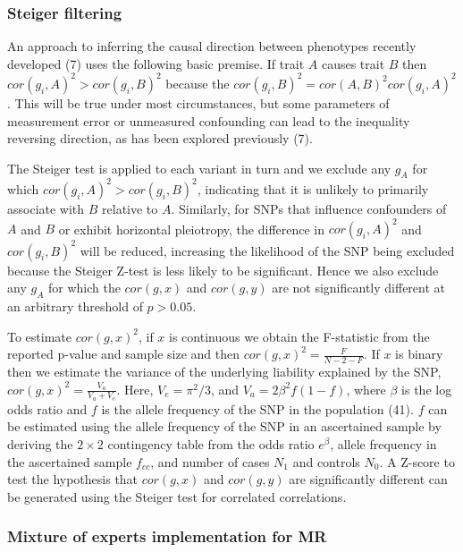 \documentclass[]{article}
\begin{document}
\subsubsection{Steiger filtering}\label{steiger-filtering-1}

An approach to inferring the causal direction between phenotypes
recently developed (7) uses the following basic premise. If trait \(A\)
causes trait \(B\) then \(cor(g_{i}, A)^2 > cor(g_{i}, B)^2\) because
the \(cor(g_{i}, B)^2 = cor(A, B)^{2} cor(g_{i}, A)^{2}\). This will be
true under most circumstances, but some parameters of measurement error
or unmeasured confounding can lead to the inequality reversing
direction, as has been explored previously (7).

The Steiger test is applied to each variant in turn and we exclude any
\(g_{A}\) for which \(cor(g_{i}, A)^2 > cor(g_{i}, B)^2\), indicating
that it is unlikely to primarily associate with \(B\) relative to \(A\).
Similarly, for SNPs that influence confounders of \(A\) and \(B\) or
exhibit horizontal pleiotropy, the difference in \(cor(g_{i}, A)^2\) and
\(cor(g_{i}, B)^2\) will be reduced, increasing the likelihood of the
SNP being excluded because the Steiger Z-test is less likely to be
significant. Hence we also exclude any \(g_{A}\) for which the
\(cor(g, x)\) and \(cor(g, y)\) are not significantly different at an
arbitrary threshold of \(p > 0.05\).

To estimate \(cor(g, x)^2\), if \(x\) is continuous we obtain the
F-statistic from the reported p-value and sample size and then
\(cor(g, x)^2 = \frac{F}{N - 2 - F}\). If \(x\) is binary then we
estimate the variance of the underlying liability explained by the SNP,
\(cor(g, x)^2 = \frac{V_a}{V_a + V_e}\). Here, \(V_e = \pi^2/3\), and
\(V_a = 2\beta^2f(1-f)\), where \(\beta\) is the log odds ratio and
\(f\) is the allele frequency of the SNP in the population (41). \(f\)
can be estimated using the allele frequency of the SNP in an ascertained
sample by deriving the \(2 \times 2\) contingency table from the odds
ratio \(e^\beta\), allele frequency in the ascertained sample
\(f_{cc}\), and number of cases \(N_1\) and controls \(N_0\). A Z-score
to test the hypothesis that \(cor(g, x)\) and \(cor(g, y)\) are
significantly different can be generated using the Steiger test for
correlated correlations.

\subsubsection{Mixture of experts implementation for
MR}\label{mixture-of-experts-implementation-for-mr}
\end{document}
